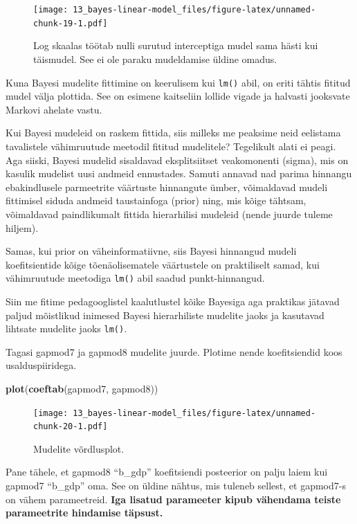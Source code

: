 \documentclass[]{book}
\newenvironment{Shaded}{\begin{snugshade}}{\end{snugshade}}
\newcommand{\KeywordTok}[1]{\textcolor[rgb]{0.13,0.29,0.53}{\textbf{#1}}}
\newcommand{\NormalTok}[1]{#1}
\begin{document}
\begin{figure}
\centering
\texttt{[image: 13\_bayes-linear-model\_files/figure-latex/unnamed-chunk-19-1.pdf]}
\caption{\label{fig:unnamed-chunk-19}Log skaalas töötab nulli surutud interceptiga mudel sama hästi kui täismudel. See ei ole paraku mudeldamise üldine omadus.}
\end{figure}

Kuna Bayesi mudelite fittimine on keerulisem kui \texttt{lm()} abil, on eriti tähtis fititud mudel välja plottida.
See on esimene kaitseliin lollide vigade ja halvasti jooksvate Markovi ahelate vastu.

Kui Bayesi mudeleid on raskem fittida, siis milleks me peaksime neid eelistama tavalistele vähimruutude meetodil fititud mudelitele?
Tegelikult alati ei peagi.
Aga siiski, Bayesi mudelid sisaldavad eksplitsiitset veakomonenti (sigma), mis on kasulik mudelist uusi andmeid ennustades.
Samuti annavad nad parima hinnangu ebakindlusele parmeetrite väärtuste hinnangute ümber, võimaldavad mudeli fittimisel siduda andmeid taustainfoga (prior) ning, mis kõige tähtsam, võimaldavad paindlikumalt fittida hierarhilisi mudeleid (nende juurde tuleme hiljem).

Samas, kui prior on väheinformatiivne, siis Bayesi hinnangud mudeli koefitsientide kõige tõenäolisematele väärtustele on praktiliselt samad, kui vähimruutude meetodiga \texttt{lm()} abil saadud punkt-hinnangud.

Siin me fitime pedagooglistel kaalutlustel kõike Bayesiga aga praktikas jätavad paljud mõistlikud inimesed Bayesi hierarhiliste mudelite jaoks ja kasutavad lihtsate mudelite jaoks \texttt{lm()}.

Tagasi gapmod7 ja gapmod8 mudelite juurde.
Plotime nende koefitsiendid koos usalduspiiridega.

\begin{Shaded}
\begin{Highlighting}[]
\KeywordTok{plot}\NormalTok{(}\KeywordTok{coeftab}\NormalTok{(gapmod7, gapmod8))}
\end{Highlighting}
\end{Shaded}

\begin{figure}
\centering
\texttt{[image: 13\_bayes-linear-model\_files/figure-latex/unnamed-chunk-20-1.pdf]}
\caption{\label{fig:unnamed-chunk-20}Mudelite võrdlusplot.}
\end{figure}

Pane tähele, et gapmod8 ``b\_gdp'' koefitsiendi posteerior on palju laiem kui gapmod7 ``b\_gdp'' oma.
See on üldine nähtus, mis tuleneb sellest, et gapmod7-s on vähem parameetreid.
\textbf{Iga lisatud parameeter kipub vähendama teiste parameetrite hindamise täpsust.}
\end{document}
